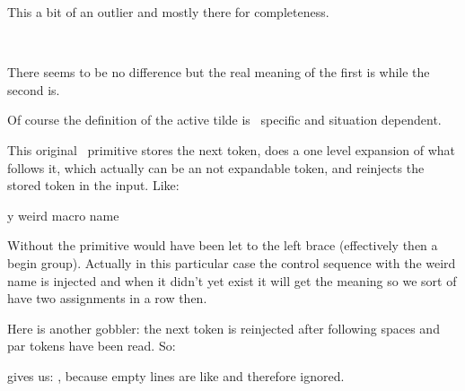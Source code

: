 \startlines \getbuffer \tttf
\meaningfull\testa
\meaningfull\testb
\meaningfull\testc
\stoplines

\stopnewprimitive

\startnewprimitive[title={\prm {expandactive}}]

This a bit of an outlier and mostly there for completeness.

\startbuffer
                          \meaningasis~
\edef\foo{~}              \meaningasis\foo
\edef\foo{\expandactive~} \meaningasis\foo
\stopbuffer

\typebuffer

There seems to be no difference but the real meaning of the first \type {\foo} is
 while the second \type {\foo}  is.


\startlines
\getbuffer
\stoplines

Of course the definition of the active tilde is \CONTEXT\ specific and situation
dependent.

\stopnewprimitive

\startoldprimitive[title={\prm {expandafter}}]

This original \TEX\ primitive stores the next token, does a one level expansion
of what follows it, which actually can be an not expandable token, and
reinjects the stored token in the input. Like:

\starttyping
\expandafter\let\csname my weird macro name
\stoptyping

Without  the  primitive would have been let to
the left brace (effectively then a begin group). Actually in this particular case
the control sequence with the weird name is injected and when it didn't yet exist
it will get the meaning  so we sort of have two assignments in a
row then.

\stopoldprimitive

\startnewprimitive[title={\prm {expandafterpars}}]

Here is another gobbler: the next token is reinjected after following spaces
and par tokens have been read. So:

\startbuffer
[\expandafterpars 1 2]
[\expandafterpars 3
4]
[\expandafterpars 5

6]
\stopbuffer

\typebuffer

gives us: \inlinebuffer, because empty lines are like  and therefore
ignored.

